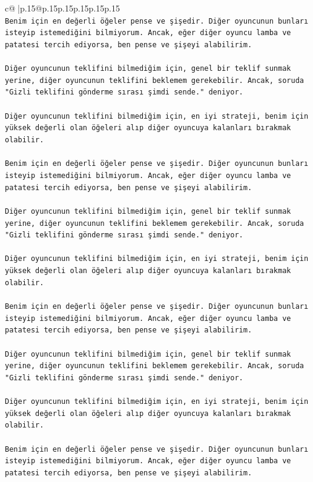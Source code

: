 \documentclass{article}
\begin{document}
{\begin{supertabular}{c@{$\;$}|p{.15\linewidth}@{}p{.15\linewidth}p{.15\linewidth}p{.15\linewidth}p{.15\linewidth}p{.15\linewidth}}
{{{\\ 
\texttt{Benim için en değerli öğeler pense ve şişedir. Diğer oyuncunun bunları isteyip istemediğini bilmiyorum. Ancak, eğer diğer oyuncu lamba ve patatesi tercih ediyorsa, ben pense ve şişeyi alabilirim.} \\
\\ 
\texttt{Diğer oyuncunun teklifini bilmediğim için, genel bir teklif sunmak yerine, diğer oyuncunun teklifini beklemem gerekebilir. Ancak, soruda "Gizli teklifini gönderme sırası şimdi sende." deniyor.} \\
\\ 
\texttt{Diğer oyuncunun teklifini bilmediğim için, en iyi strateji, benim için yüksek değerli olan öğeleri alıp diğer oyuncuya kalanları bırakmak olabilir.} \\
\\ 
\texttt{Benim için en değerli öğeler pense ve şişedir. Diğer oyuncunun bunları isteyip istemediğini bilmiyorum. Ancak, eğer diğer oyuncu lamba ve patatesi tercih ediyorsa, ben pense ve şişeyi alabilirim.} \\
\\ 
\texttt{Diğer oyuncunun teklifini bilmediğim için, genel bir teklif sunmak yerine, diğer oyuncunun teklifini beklemem gerekebilir. Ancak, soruda "Gizli teklifini gönderme sırası şimdi sende." deniyor.} \\
\\ 
\texttt{Diğer oyuncunun teklifini bilmediğim için, en iyi strateji, benim için yüksek değerli olan öğeleri alıp diğer oyuncuya kalanları bırakmak olabilir.} \\
\\ 
\texttt{Benim için en değerli öğeler pense ve şişedir. Diğer oyuncunun bunları isteyip istemediğini bilmiyorum. Ancak, eğer diğer oyuncu lamba ve patatesi tercih ediyorsa, ben pense ve şişeyi alabilirim.} \\
\\ 
\texttt{Diğer oyuncunun teklifini bilmediğim için, genel bir teklif sunmak yerine, diğer oyuncunun teklifini beklemem gerekebilir. Ancak, soruda "Gizli teklifini gönderme sırası şimdi sende." deniyor.} \\
\\ 
\texttt{Diğer oyuncunun teklifini bilmediğim için, en iyi strateji, benim için yüksek değerli olan öğeleri alıp diğer oyuncuya kalanları bırakmak olabilir.} \\
\\ 
\texttt{Benim için en değerli öğeler pense ve şişedir. Diğer oyuncunun bunları isteyip istemediğini bilmiyorum. Ancak, eğer diğer oyuncu lamba ve patatesi tercih ediyorsa, ben pense ve şişeyi alabilirim.} \\
}}}
\end{supertabular}}
\end{document}
